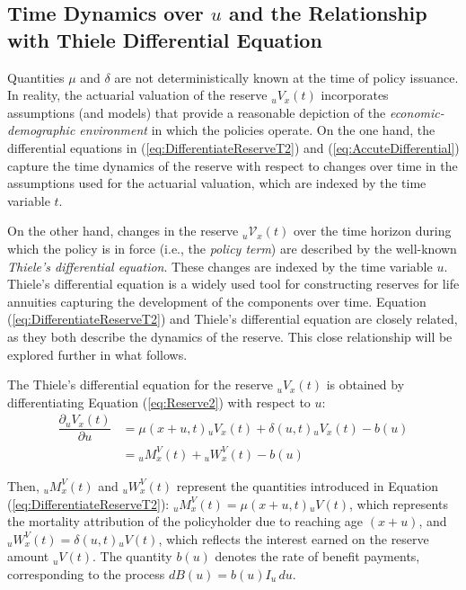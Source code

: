 \documentclass[12pt]{article}
\begin{document}
\subsection{Time Dynamics over $u$ and the Relationship with Thiele Differential Equation}\label{sec:ThieleEquations}


Quantities \( \mu \) and \( \delta \) are not deterministically known at the time of policy issuance. In reality, the actuarial valuation of the reserve \( {}_uV_x(t) \) incorporates assumptions (and models) that provide a reasonable depiction of the \textit{economic-demographic environment} in which the policies operate. On the one hand, the differential equations in (\ref{eq:DifferentiateReserveT2}) and (\ref{eq:AccuteDifferential}) capture the time dynamics of the reserve with respect to changes over time in the assumptions used for the actuarial valuation, which are indexed by the time variable \( t \).

On the other hand, changes in the reserve \( {}_u\mathcal{V}_x(t) \) over the time horizon during which the policy is in force (i.e., the \textit{policy term}) are described by the well-known \textit{Thiele's differential equation}. These changes are indexed by the time variable \( u \). Thiele's differential equation is a widely used tool for constructing reserves for life annuities capturing the development of the components over time. Equation (\ref{eq:DifferentiateReserveT2}) and Thiele's differential equation are closely related, as they both describe the dynamics of the reserve. This close relationship will be explored further in what follows.

The Thiele's differential equation for the reserve \( {}_uV_x(t) \) is obtained by differentiating Equation (\ref{eq:Reserve2}) with respect to \( u \):
\begin{equation}\label{eq:Thiele}
	\begin{split}
		\dfrac{\partial {}_uV_x(t)}{\partial u}&= \mu(x+u,t){}_uV_x(t) + \delta(u,t){}_uV_x(t) - b(u) \\
		&= {}_uM^V_x(t) + {}_uW^V_x(t) - b(u)
	\end{split}
\end{equation}

Then, ${}_uM^V_x(t)$ and ${}_uW^V_x(t)$ represent the quantities introduced in Equation (\ref{eq:DifferentiateReserveT2}): ${}_uM^V_x(t) = \mu(x+u,t){}_uV(t)$, which represents the mortality attribution of the policyholder due to reaching age \( (x+u) \), and ${}_uW^V_x(t) = \delta(u,t){}_uV(t)$, which reflects the interest earned on the reserve amount ${}_uV(t)$. The quantity \( b(u) \) denotes the rate of benefit payments, corresponding to the process \( dB(u) = b(u) I_{u} \, du \).
\end{document}
